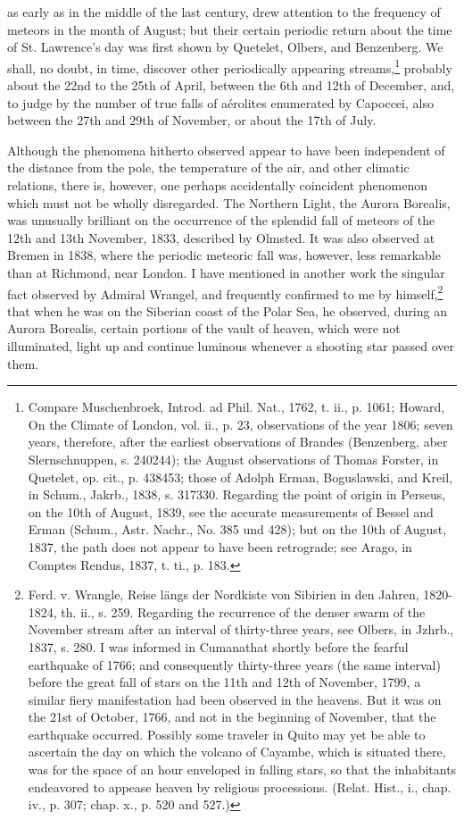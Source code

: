 {} as early as in the middle of the last century, drew attention to the frequency of meteors in the month of August; but their certain periodic return about the time of St. Lawrence's day was first shown by Quetelet, Olbers, and Benzenberg. We shall, no doubt, in time, discover other periodically appearing streams,\footnote{Compare Muschenbroek, Introd. ad Phil. Nat., 1762, t. ii., p. 1061; Howard, On the Climate of London, vol. ii., p. 23, observations of the year 1806; seven years, therefore, after the earliest observations of Brandes (Benzenberg, aber Slernschnuppen, s. 240244); the August observations of Thomas Forster, in Quetelet, op. cit., p. 438453; those of Adolph Erman, Boguslawski, and Kreil, in Schum., Jakrb., 1838, s. 317330. Regarding the point of origin in Perseus, on the 10th of August, 1839, see the accurate measurements of Bessel and Erman (Schum., Astr. Nachr., No. 385 und 428); but on the 10th of August, 1837, the path does not appear to have been retrograde; see Arago, in Comptes Rendus, 1837, t. ti., p. 183.} probably about the 22nd to the 25th of April, between the 6th and 12th of December, and, to judge by the number of true falls of a\'{e}rolites enumerated by Capoccei, also between the 27th and 29th of November, or about the 17th of July.

Although the phenomena hitherto observed appear to have been independent of the distance from the pole, the temperature of the air, and other climatic relations, there is, however, one perhaps accidentally coincident phenomenon which must not be wholly disregarded. The Northern Light, the Aurora Borealis, was unusually brilliant on the occurrence of the splendid fall of meteors of the 12th and 13th November, 1833, described by Olmsted. It was also observed at Bremen in 1838, where the periodic meteoric fall was, however, less remarkable than at Richmond, near London. I have mentioned in another work the singular fact observed by Admiral Wrangel, and frequently confirmed to me by himself,\footnote{Ferd. v. Wrangle, Reise längs der Nordkiste von Sibirien in den Jahren, 1820-1824, th. ii., s. 259. Regarding the recurrence of the denser swarm of the November stream after an interval of thirty-three years, see Olbers, in Jzhrb., 1837, s. 280. I was informed in Cumanathat shortly before the fearful earthquake of 1766; and consequently thirty-three years (the same interval) before the great fall of stars on the 11th and 12th of November, 1799, a similar fiery manifestation had been observed in the heavens. But it was on the 21st of October, 1766, and not in the beginning of November, that the earthquake occurred. Possibly some traveler in Quito may yet be able to ascertain the day on which the volcano of Cayambe, which is situated there, was for the space of an hour enveloped in falling stars, so that the inhabitants endeavored to appease heaven by religious processions. (Relat. Hist., i., chap. iv., p. 307; chap. x., p. 520 and 527.)} that when he was on the Siberian coast of the Polar Sea, he observed, during an Aurora Borealis, certain portions of the vault of heaven, which were not illuminated, light up and continue luminous whenever a shooting star passed over them.

